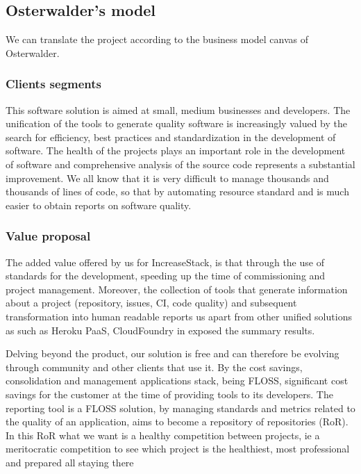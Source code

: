 \documentclass[11pt]{scrartcl}
\begin{document}
\subsection{Osterwalder's model}

\par We can translate the project according to the business model canvas of Osterwalder.

\subsubsection{Clients segments}

This software solution is aimed at small, medium businesses and developers. The unification of the tools to generate quality software is increasingly valued by the search for efficiency, best practices and standardization in the development of software. The health of the projects plays an important role in the development of software and comprehensive analysis of the source code represents a substantial improvement. We all know that it is very difficult to manage thousands and thousands of lines of code, so that by automating resource standard and is much easier to obtain reports on software quality.
    
\subsubsection{Value proposal}
    
\par The added value offered by us for IncreaseStack, is that through the use of standards for the development, speeding up the time of commissioning and project management. Moreover, the collection of tools that generate information about a project (repository, issues, CI, code quality) and subsequent transformation into human readable reports us apart from other unified solutions as such as Heroku PaaS, CloudFoundry in exposed the summary results.

\par Delving beyond the product, our solution is free and can therefore be evolving through community and other clients that use it. By the cost savings, consolidation and management applications stack, being FLOSS, significant cost savings for the customer at the time of providing tools to its developers. The reporting tool is a FLOSS solution, by managing standards and metrics related to the quality of an application, aims to become a repository of repositories (RoR). In this RoR what we want is a healthy competition between projects, ie a meritocratic competition to see which project is the healthiest, most professional and prepared all staying there
\end{document}
